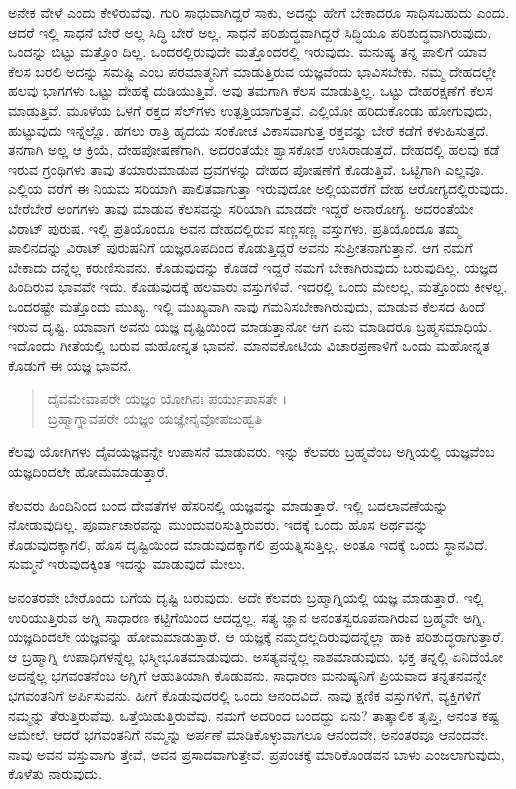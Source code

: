 ಅನೇಕ ವೇಳೆ  ಎಂದು ಕೇಳಿರುವೆವು. ಗುರಿ ಸಾಧುವಾಗಿದ್ದರೆ ಸಾಕು, ಅದನ್ನು ಹೇಗೆ ಬೇಕಾದರೂ ಸಾಧಿಸಬಹುದು ಎಂದು. ಆದರೆ ಇಲ್ಲಿ ಸಾಧನೆ ಬೇರೆ ಅಲ್ಲ ಸಿದ್ಧಿ ಬೇರೆ ಅಲ್ಲ. ಸಾಧನೆ ಪರಿಶುದ್ಧವಾಗಿದ್ದರೆ ಸಿದ್ಧಿಯೂ ಪರಿಶುದ್ಧವಾಗಿರುವುದು. ಒಂದನ್ನು ಬಿಟ್ಟು ಮತ್ತೊಂ ದಿಲ್ಲ. ಒಂದರಲ್ಲಿರುವುದೇ ಮತ್ತೊಂದರಲ್ಲಿ ಇರುವುದು. ಮನುಷ್ಯ ತನ್ನ ಪಾಲಿಗೆ ಯಾವ ಕೆಲಸ ಬರಲಿ ಅದನ್ನು ಸಮಷ್ಟಿ ಎಂಬ ಪರಮಾತ್ಮನಿಗೆ ಮಾಡುತ್ತಿರುವ ಯಜ್ಞವೆಂದು ಭಾವಿಸಬೇಕು. ನಮ್ಮ ದೇಹದಲ್ಲೇ ಹಲವು ಭಾಗಗಳು ಒಟ್ಟು ದೇಹಕ್ಕೆ ದುಡಿಯುತ್ತಿವೆ. ಅವು ತಮಗಾಗಿ ಕೆಲಸ ಮಾಡುತ್ತಿಲ್ಲ. ಒಟ್ಟು ದೇಹರಕ್ಷಣೆಗೆ ಕೆಲಸ ಮಾಡುತ್ತಿವೆ. ಮೂಳೆಯ ಒಳಗೆ ರಕ್ತದ ಸೆಲ್​ಗಳು ಉತ್ಪತ್ತಿಯಾಗುತ್ತವೆ. ಎಲ್ಲಿಯೋ ಹರಿದುಕೊಂಡು ಹೋಗುವುದು, ಹುಟ್ಟುವುದು ಇನ್ನೆಲ್ಲೊ. ಹಗಲು ರಾತ್ರಿ ಹೃದಯ ಸಂಕೋಚ ವಿಕಾಸವಾಗುತ್ತ ರಕ್ತವನ್ನು ಬೇರೆ ಕಡೆಗೆ ಕಳುಹಿಸುತ್ತದೆ. ತನಗಾಗಿ ಅಲ್ಲ ಆ ಕ್ರಿಯೆ, ದೇಹಪೋಷಣೆಗಾಗಿ. ಅದರಂತೆಯೇ ಶ್ವಾಸಕೋಶ ಉಸಿರಾಡುತ್ತದೆ. ದೇಹದಲ್ಲಿ ಹಲವು ಕಡೆ ಇರುವ ಗ್ರಂಥಿಗಳು  ತಾವು ತಯಾರುಮಾಡುವ ದ್ರವಗಳನ್ನು ದೇಹದ ಪೋಷಣೆಗೆ ಕೊಡುತ್ತಿವೆ. ಒಟ್ಟಿಗಾಗಿ ಎಲ್ಲವೂ. ಎಲ್ಲಿಯ ವರೆಗೆ ಈ ನಿಯಮ ಸರಿಯಾಗಿ ಪಾಲಿತವಾಗುತ್ತಾ ಇರುವುದೋ ಅಲ್ಲಿಯವರೆಗೆ ದೇಹ ಆರೋಗ್ಯದಲ್ಲಿರುವುದು. ಬೇರೆಬೇರೆ ಅಂಗಗಳು ತಾವು ಮಾಡುವ ಕೆಲಸವನ್ನು ಸರಿಯಾಗಿ ಮಾಡದೇ ಇದ್ದರೆ ಅನಾರೋಗ್ಯ. ಅದರಂತೆಯೇ ವಿರಾಟ್ ಪುರುಷ. ಇಲ್ಲಿ ಪ್ರತಿಯೊಂದೂ ಅವನ ದೇಹದಲ್ಲಿರುವ ಸಣ್ಣಸಣ್ಣ ವಸ್ತುಗಳು. ಪ್ರತಿಯೊಂದೂ ತಮ್ಮ ಪಾಲಿನದನ್ನು ವಿರಾಟ್ ಪುರುಷನಿಗೆ ಯಜ್ಞರೂಪದಿಂದ ಕೊಡುತ್ತಿದ್ದರೆ ಅವನು ಸುಪ್ರೀತನಾಗುತ್ತಾನೆ. ಆಗ ನಮಗೆ ಬೇಕಾದು ದನ್ನೆಲ್ಲ ಕರುಣಿಸುವನು. ಕೊಡುವುದನ್ನು ಕೊಡದೆ ಇದ್ದರೆ ನಮಗೆ ಬೇಕಾಗಿರುವುದು ಬರುವುದಿಲ್ಲ. ಯಜ್ಞದ ಹಿಂದಿರುವ ಭಾವವೇ ಇದು. ಕೊಡುವುದಕ್ಕೆ ಹಲವಾರು ವಸ್ತುಗಳಿವೆ. ಇದರಲ್ಲಿ ಒಂದು ಮೇಲಲ್ಲ, ಮತ್ತೊಂದು ಕೀಳಲ್ಲ. ಒಂದರಷ್ಟೇ ಮತ್ತೊಂದು ಮುಖ್ಯ. ಇಲ್ಲಿ ಮುಖ್ಯವಾಗಿ ನಾವು ಗಮನಿಸಬೇಕಾಗಿರುವುದು, ಮಾಡುವ ಕೆಲಸದ ಹಿಂದೆ ಇರುವ ದೃಷ್ಟಿ. ಯಾವಾಗ ಅವನು ಯಜ್ಞ ದೃಷ್ಟಿಯಿಂದ ಮಾಡುತ್ತಾನೋ ಆಗ ಏನು ಮಾಡಿದರೂ ಬ್ರಹ್ಮಸಮಾಧಿಯೆ. ಇದೊಂದು ಗೀತೆಯಲ್ಲಿ ಬರುವ ಮಹೋನ್ನತ ಭಾವನೆ. ಮಾನವಕೋಟಿಯ ವಿಚಾರಪ್ರಣಾಳಿಗೆ ಒಂದು ಮಹೋನ್ನತ ಕೊಡುಗೆ ಈ ಯಜ್ಞ ಭಾವನೆ.

\begin{verse}
ದೈವಮೇವಾಪರೇ ಯಜ್ಞಂ ಯೋಗಿನಃ ಪರ್ಯುಪಾಸತೇ ।\\ಬ್ರಹ್ಮಾಗ್ನಾವಪರೇ ಯಜ್ಞಂ ಯಜ್ಞೇನೈವೋಪಜುಹ್ವತಿ 
\end{verse}

{\small ಕೆಲವು ಯೋಗಿಗಳು ದೈವಯಜ್ಞವನ್ನೇ ಉಪಾಸನೆ ಮಾಡುವರು. ಇನ್ನು ಕೆಲವರು ಬ್ರಹ್ಮವೆಂಬ ಅಗ್ನಿಯಲ್ಲಿ ಯಜ್ಞವೆಂಬ ಯಜ್ಞದಿಂದಲೇ ಹೋಮಮಾಡುತ್ತಾರೆ.}

ಕೆಲವರು ಹಿಂದಿನಿಂದ ಬಂದ ದೇವತೆಗಳ ಹೆಸರಿನಲ್ಲಿ ಯಜ್ಞವನ್ನು ಮಾಡುತ್ತಾರೆ. ಇಲ್ಲಿ ಬದಲಾವಣೆಯನ್ನು ನೋಡುವುದಿಲ್ಲ. ಪೂರ್ವಾಚಾರವನ್ನು ಮುಂದುವರಿಸುತ್ತಿರುವರು. ಇದಕ್ಕೆ ಒಂದು ಹೊಸ ಅರ್ಥವನ್ನು ಕೊಡುವುದಕ್ಕಾಗಲಿ, ಹೊಸ ದೃಷ್ಟಿಯಿಂದ ಮಾಡುವುದಕ್ಕಾಗಲಿ ಪ್ರಯತ್ನಿಸುತ್ತಿಲ್ಲ. ಅಂತೂ ಇದಕ್ಕೆ ಒಂದು ಸ್ಥಾನವಿದೆ. ಸುಮ್ಮನೆ ಇರುವುದಕ್ಕಿಂತ ಇದನ್ನು ಮಾಡುವುದೆ ಮೇಲು.

ಅನಂತರವೇ ಬೇರೊಂದು ಬಗೆಯ ದೃಷ್ಟಿ ಬರುವುದು. ಅದೇ ಕೆಲವರು ಬ್ರಹ್ಮಾಗ್ನಿಯಲ್ಲಿ ಯಜ್ಞ ಮಾಡುತ್ತಾರೆ. ಇಲ್ಲಿ ಉರಿಯುತ್ತಿರುವ ಅಗ್ನಿ ಸಾಧಾರಣ ಕಟ್ಟಿಗೆಯಿಂದ ಆದದ್ದಲ್ಲ. ಸತ್ಯ ಜ್ಞಾನ ಅನಂತಸ್ವರೂಪನಾಗಿರುವ ಬ್ರಹ್ಮವೇ ಅಗ್ನಿ. ಯಜ್ಞದಿಂದಲೇ ಯಜ್ಞವನ್ನು ಹೋಮಮಾಡುತ್ತಾರೆ. ಆ ಯಜ್ಞಕ್ಕೆ ನಮ್ಮದಲ್ಲದಿರುವುದನ್ನೆಲ್ಲಾ ಹಾಕಿ ಪರಿಶುದ್ಧರಾಗುತ್ತಾರೆ. ಆ ಬ್ರಹ್ಮಾಗ್ನಿ ಉಪಾಧಿಗಳನ್ನೆಲ್ಲ ಭಸ್ಮೀಭೂತಮಾಡುವುದು. ಅಸತ್ಯವನ್ನೆಲ್ಲ ನಾಶಮಾಡುವುದು. ಭಕ್ತ ತನ್ನಲ್ಲಿ ಏನಿದೆಯೋ ಅದನ್ನೆಲ್ಲ ಭಗವಂತನೆಂಬ ಅಗ್ನಿಗೆ ಆಹುತಿಯಾಗಿ ಕೊಡುವನು. ಸಾಧಾರಣ ಮನುಷ್ಯನಿಗೆ ಪ್ರಿಯವಾದ ತನ್ನತನವನ್ನೇ ಭಗವಂತನಿಗೆ ಅರ್ಪಿಸುವನು. ಹೀಗೆ ಕೊಡುವುದರಲ್ಲಿ ಒಂದು ಆನಂದವಿದೆ. ನಾವು ಕ್ಷಣಿಕ ವಸ್ತುಗಳಿಗೆ, ವ್ಯಕ್ತಿಗಳಿಗೆ ನಮ್ಮನ್ನು ತೆರುತ್ತಿರುವೆವು. ಒತ್ತೆಯಿಡುತ್ತಿರುವೆವು. ನಮಗೆ ಅದರಿಂದ ಬಂದದ್ದು ಏನು? ತಾತ್ಕಾಲಿಕ ತೃಪ್ತಿ, ಅನಂತ ಕಷ್ಟ ಆಮೇಲೆ. ಆದರೆ ಭಗವಂತನಿಗೆ ನಮ್ಮನ್ನು ಅರ್ಪಣೆ ಮಾಡಿಕೊಳ್ಳುವಾಗಲೂ ಆನಂದವೇ, ಅನಂತರವೂ ಆನಂದವೇ. ನಾವು ಅವನ ವಸ್ತುವಾಗು ತ್ತೇವೆ, ಅವನ ಪ್ರಸಾದವಾಗುತ್ತೇವೆ. ಪ್ರಪಂಚಕ್ಕೆ ಮಾರಿಕೊಂಡವನ ಬಾಳು ಎಂಜಲಾಗುವುದು, ಕೊಳೆತು ನಾರುವುದು.

